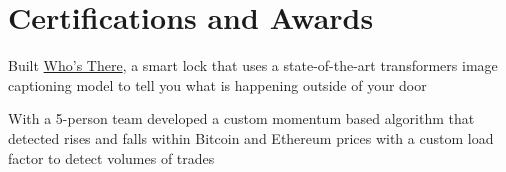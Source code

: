 \documentclass[]{resume-template}
\begin{document}
\begin{minipage}[t]{0.66\textwidth}


    \section{Certifications and Awards}\label{sec:certifications-and-awards}
    \begin{tightemize}
        \item Built \href{https://devpost.com/software/who-s-there-wkdheghttps://devpost.com/software/who-s-there-wkdheg}{Who's There}, a smart lock that uses a state-of-the-art transformers image captioning model to tell you what is happening outside of your door
    \end{tightemize}
    \sectionsep{}
    \begin{tightemize}
        \item With a  5-person team developed a custom momentum based algorithm that detected rises and falls within
        Bitcoin and Ethereum prices with a custom load factor to detect volumes of trades
    \end{tightemize}
    \sectionsep{}
    \sectionsep{}


\end{minipage}
\end{document}
